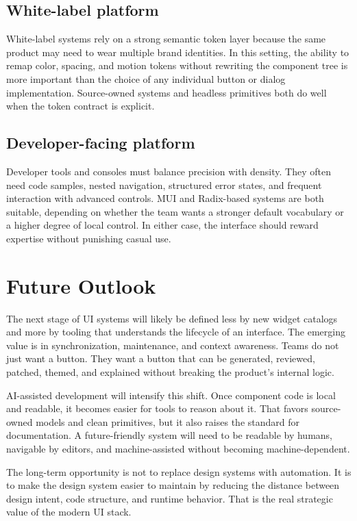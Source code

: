 \documentclass[11pt,twoside,a4paper]{article}
\begin{document}
\subsection{White-label platform}
White-label systems rely on a strong semantic token layer because the same product may need to wear multiple brand identities. In this setting, the ability to remap color, spacing, and motion tokens without rewriting the component tree is more important than the choice of any individual button or dialog implementation. Source-owned systems and headless primitives both do well when the token contract is explicit.

\subsection{Developer-facing platform}
Developer tools and consoles must balance precision with density. They often need code samples, nested navigation, structured error states, and frequent interaction with advanced controls. MUI and Radix-based systems are both suitable, depending on whether the team wants a stronger default vocabulary or a higher degree of local control. In either case, the interface should reward expertise without punishing casual use.

\section{Future Outlook}
The next stage of UI systems will likely be defined less by new widget catalogs and more by tooling that understands the lifecycle of an interface. The emerging value is in synchronization, maintenance, and context awareness. Teams do not just want a button. They want a button that can be generated, reviewed, patched, themed, and explained without breaking the product's internal logic.

AI-assisted development will intensify this shift. Once component code is local and readable, it becomes easier for tools to reason about it. That favors source-owned models and clean primitives, but it also raises the standard for documentation. A future-friendly system will need to be readable by humans, navigable by editors, and machine-assisted without becoming machine-dependent.

The long-term opportunity is not to replace design systems with automation. It is to make the design system easier to maintain by reducing the distance between design intent, code structure, and runtime behavior. That is the real strategic value of the modern UI stack.
\end{document}
